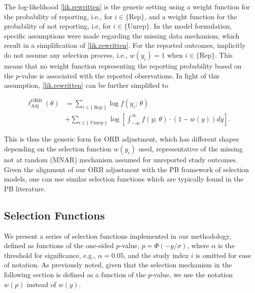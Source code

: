 \documentclass[twocolumn]{article}\usepackage[]{graphicx}\usepackage[]{xcolor}
\begin{document}
\bigskip


The log-likelihood \eqref{lik.rewritten} is the generic setting using a weight function for the probability of reporting, i.e., for $i \in \{\text{Rep} \}$, and a weight function for the probability of not reporting, i.e, for $i \in \{\text{Unrep} \}$. In the \citet{Copas2019} model formulation, specific assumptions were made regarding the missing data mechanism, which result in a simplification of \eqref{lik.rewritten}. For the reported outcomes, \citet{Copas2019} implicitly do not assume any selection process, i.e., $w(y_i)=1$ when $i \in \{\text{Rep} \}$. This means that no weight function representing the reporting probability based on the $p$-value is associated with the reported observations. In light of this assumption, \eqref{lik.rewritten} can be further simplified to


\begin{equation}
\label{lik.rewritten.special.copas.case}
\begin{aligned}
\ell_{\text{Adj}}^{\text{ORB}} \left(\theta \right) & = \sum_{i \in \{\operatorname{Rep} \} } \log f(y_i \text{; } \theta)\\
&+ \sum_{i \in \{ \operatorname{Unrep} \}} \log \left[ \int_{-\infty}^{\infty} f(y \text{; } \theta) \cdot \left( 1 - w(y) \right) d y \right] \text{.}
\end{aligned}
\end{equation}


This is thus the generic form for ORB adjustment, which has different shapes depending on the selection function $w(y_i)$ used, representative of the missing not at random (MNAR) mechanism assumed for unreported study outcomes. Given the alignment of our ORB adjustment with the PB framework of selection models, one can use similar selection functions which are typically found in the PB literature. 

\subsection{Selection Functions} \label{ourSELs}

We present a series of selection functions implemented in our methodology, defined as functions of the one-sided $p$-value, $p = \Phi(- y / \sigma)$, where $\alpha$ is the threshold for significance, e.g., $\alpha=0.05$, and the study index $i$ is omitted for ease of notation. As previously noted, given that the selection mechanism in the following section is defined as a function of the $p$-value, we use the notation $w(p)$ instead of $w(y)$. 
\end{document}
